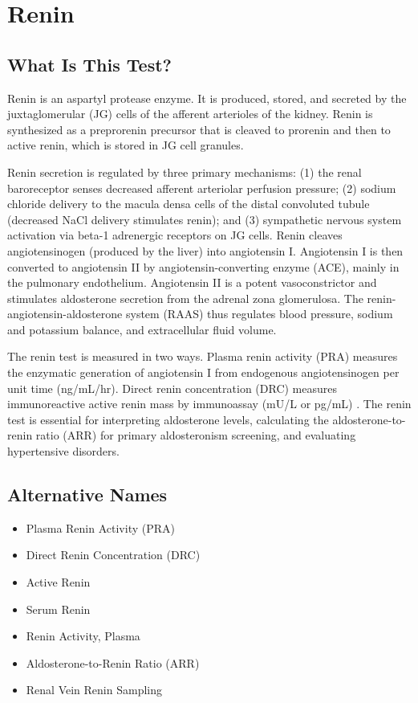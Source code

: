\chapter{Renin}

\section*{What Is This Test?}
Renin is an aspartyl protease enzyme. It is produced, stored, and secreted by the juxtaglomerular (JG) cells of the afferent arterioles of the kidney. Renin is synthesized as a preprorenin precursor that is cleaved to prorenin and then to active renin, which is stored in JG cell granules.

Renin secretion is regulated by three primary mechanisms: (1) the renal baroreceptor senses decreased afferent arteriolar perfusion pressure; (2) sodium chloride delivery to the macula densa cells of the distal convoluted tubule (decreased NaCl delivery stimulates renin); and (3) sympathetic nervous system activation via beta-1 adrenergic receptors on JG cells. Renin cleaves angiotensinogen (produced by the liver) into angiotensin I. Angiotensin I is then converted to angiotensin II by angiotensin-converting enzyme (ACE), mainly in the pulmonary endothelium. Angiotensin II is a potent vasoconstrictor and stimulates aldosterone secretion from the adrenal zona glomerulosa. The renin-angiotensin-aldosterone system (RAAS) thus regulates blood pressure, sodium and potassium balance, and extracellular fluid volume.

The renin test is measured in two ways. Plasma renin activity (PRA) measures the enzymatic generation of angiotensin I from endogenous angiotensinogen per unit time (ng/mL/hr). Direct renin concentration (DRC) measures immunoreactive active renin mass by immunoassay (mU/L or pg/mL) \cite{tietz2012textbook}. The renin test is essential for interpreting aldosterone levels, calculating the aldosterone-to-renin ratio (ARR) for primary aldosteronism screening, and evaluating hypertensive disorders.

\section*{Alternative Names}
\begin{itemize}
  \item Plasma Renin Activity (PRA)
  \item Direct Renin Concentration (DRC)
  \item Active Renin
  \item Serum Renin
  \item Renin Activity, Plasma
  \item Aldosterone-to-Renin Ratio (ARR)
  \item Renal Vein Renin Sampling
\end{itemize}
